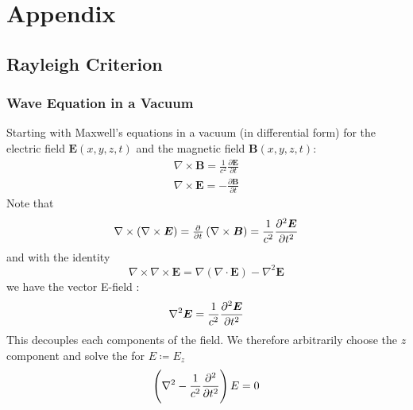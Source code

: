 %
%
%
%
%
\newcommand*{\E}{\bm{E}}
\newcommand*{\B}{\bm{B}}
\newcommand*{\rr}{\bm{r}}
\newcommand*{\Ef}{\textit{\textbf{E}} }
\section{Appendix}\label{sec:appendix}
\localtableofcontents

\subsection{Rayleigh Criterion}

\subsubsection{Wave Equation in a Vacuum}

Starting with Maxwell's equations in a vacuum (in differential form) for the electric field \(\E(x,y,z, t)\) and the magnetic field \(\B(x,y,z, t)\):
%
\begin{align}
    \nabla \times \B = \frac{1}{c^2} \frac{\partial \E}{\partial t} \\
    \nabla \times \E = - \frac{\partial \B}{\partial t}
\end{align}
%
Note that
%
\begin{equation}
    \nabla \times \left( \nabla \times \E \right) = \pd{}{t} \left( \nabla \times \B\right) = \frac{1}{c^2} \pdv[2]{\E}{t}
\end{equation}
%
and with the identity
\begin{equation}
    \nabla \times \nabla \times \E = \nabla (\nabla\cdot \E) - \nabla^2 \E
\end{equation}
%
we have the vector E-field :
%
\begin{equation}
    \nabla^2 \E = \frac{1}{c^2} \pdv[2]{\E}{t}
\end{equation}
%
This decouples each components of the  field. We therefore arbitrarily choose the \(z\) component and solve the  for \(E \coloneqq E_z\)
%
\begin{equation}
    \left(\nabla^2 - \frac{1}{c^2} \pdv[2]{}{t}\right) E = 0 \label{eqn:scalarwaveeqn}
\end{equation}
%

